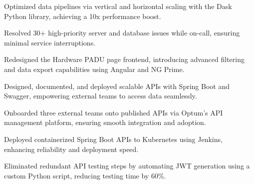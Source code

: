 \begin{cventries}
{\begin{cvitems}
        \item {Optimized data pipelines via vertical and horizontal scaling with the Dask Python library, achieving a 10x performance boost.}
        \item {Resolved 30+ high-priority server and database issues while on-call, ensuring minimal service interruptions.}
        \item {Redesigned the Hardware PADU page frontend, introducing advanced filtering and data export capabilities using Angular and NG Prime.}
        \item {Designed, documented, and deployed scalable APIs with Spring Boot and Swagger, empowering external teams to access data seamlessly.}
        \item {Onboarded three external teams onto published APIs via Optum's API management platform, ensuring smooth integration and adoption.}
        \item {Deployed containerized Spring Boot APIs to Kubernetes using Jenkins, enhancing reliability and deployment speed.}
        \item {Eliminated redundant API testing steps by automating JWT generation using a custom Python script, reducing testing time by 60\%.}
      \end{cvitems}
    }

\end{cventries}
